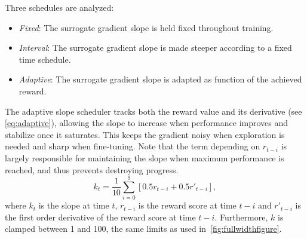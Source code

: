 Three schedules are analyzed:
\begin{itemize}
    \item \textit{Fixed}: The surrogate gradient slope is held fixed throughout training.
    \item \textit{Interval}: The surrogate gradient slope is made steeper according to a fixed time schedule.
    \item \textit{Adaptive}: The surrogate gradient slope is adapted as function of the achieved reward.
\end{itemize}
The adaptive slope scheduler tracks both the reward value and its derivative (see \autoref{eq:adaptive}), allowing the slope to increase when performance improves and stabilize once it saturates. This keeps the gradient noisy when exploration is needed and sharp when fine-tuning.
Note that the term depending on $r_{t-i}$ is largely responsible for maintaining the slope when maximum performance is reached, and thus prevents destroying progress.
\begin{equation}\label{eq:adaptive}
    k_t = \frac{1}{10} \sum_{i=0}^{9} \left[0.5 r_{t-i} + 0.5 r'_{t-i}\right],
\end{equation}
where $k_t$ is the slope at time $t$, $r_{t-i}$ is the reward score at time $t-i$ and $r'_{t-i}$ is the first order derivative of the reward score at time $t-i$.
Furthermore, $k$ is clamped between 1 and 100, the same limits as used in~\autoref{fig:fullwidthfigure}. 




